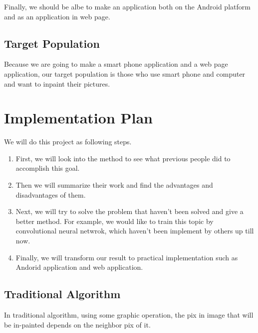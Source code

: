 \documentclass[12pt]{article}
\begin{document}
\qquad Finally, we should be albe to make an application both on the Android platform and as an application in web page.
\subsection{Target Population}
\qquad Because we are going to make a smart phone application and a web page application, our target population is those who use smart phone and computer and want to inpaint their pictures.
\section{Implementation Plan}
We will do this project as following steps.
\begin{enumerate}[1.]
	\item First, we will look into the method to see what previous people did to accomplish this goal. 
	\item Then we will summarize their work and find the advantages and disadvantages of them. 
	\item Next, we will try to solve the problem that haven't been solved and give a better method. For example, we would like to train this topic by convolutional neural netwrok, which haven't been implement by others up till now. 
	\item Finally, we will transform our result to practical implementation such as Andorid application and web application.
\end{enumerate}
\subsection{Traditional Algorithm}
\qquad In traditional algorithm, using some graphic operation, the pix in image that will be in-painted depends on the neighbor pix of it. 
\end{document}

